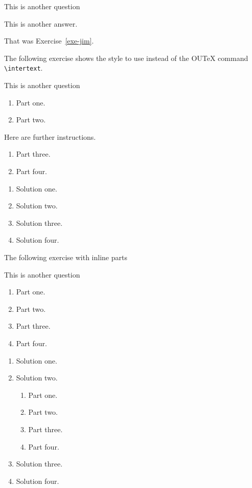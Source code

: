 \documentclass[solutionsatend,twocolumnsolutions]{ouunit}
\begin{document}
\begin{exercise}\label{exe-jim}
This is another question
\begin{solution}
This is another answer.
\end{solution}
\end{exercise}
That was Exercise~\ref{exe-jim}. 


The following exercise shows the style to use instead of the OUTeX command \verb"\intertext".
\begin{exercise}\label{exe-intertext}
This is another question
\begin{enumerate}
\item Part one.
\item Part two.
\end{enumerate}
Here are further instructions.
\begin{enumerate}[resume]
\item Part three.
\item Part four.
\end{enumerate}
\begin{solution}
\begin{enumerate}
\item Solution one.
\item Solution two.
\item Solution three.
\item Solution four.
\end{enumerate}
\end{solution}
\end{exercise}
The following exercise with inline parts
\begin{exercise}\label{exe-intertext2}
This is another question
\begin{enumerate}
\item Part one.
\item Part two.
\item Part three.
\item Part four.
\end{enumerate}
\begin{solution}
\begin{enumerate}
\item Solution one.
\item Solution two.
\begin{enumerate}
\item Part one.
\item Part two.
\item Part three.
\item Part four.
\end{enumerate}
\item Solution three.
\item Solution four.
\end{enumerate}
\end{solution}
\end{exercise}
\end{document}
